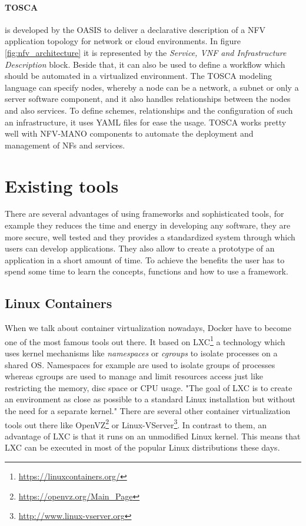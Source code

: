 \paragraph{\ac{TOSCA}} is developed by the \ac{OASIS} to deliver a declarative description of a \ac{NFV} application topology for network or cloud environments.\autocite[cf.]{Tosca:NFV}
In figure \ref{fig:nfv_architecture} it is represented by the \textit{Service, VNF and Infrastructure Description} block.
Beside that, it can also be used to define a workflow which should be automated in a virtualized environment.\autocite[cf.]{Tosca:NFV}
The \ac{TOSCA} modeling language can specify nodes, whereby a node can be a network, a subnet or only a server software component, and it also handles relationships between the nodes and also services.\autocite[cf.]{Tosca:NFV}
To define schemes, relationships and the configuration of such an infrastructure, it uses \ac{YAML} files for ease the usage.\autocite[cf.]{Tosca:NFV}
\ac{TOSCA} works pretty well with \ac{NFV-MANO} components to automate the deployment and management of \acp{NF} and services.


\section{Existing tools}

There are several advantages of using frameworks and sophisticated tools, for example they reduces the time and energy in developing any software, they are more secure, well tested and they provides a standardized system through which users can develop applications.
They also allow to create a prototype of an application in a short amount of time.
To achieve the benefits the user has to spend some time to learn the concepts, functions and how to use a framework.

\subsection{Linux Containers}
When we talk about container virtualization nowadays, Docker have to become one of the most famous tools out there.
It based on \ac{LXC}\footnote{\url{https://linuxcontainers.org/}} a technology which uses kernel mechanisms like \textit{namespaces} or \textit{cgroups} to isolate processes on a shared \ac{OS}.\autocite[cf.][p. 381]{Pahl:2015}
Namespaces for example are used to isolate groups of processes whereas cgroups are used to manage and limit resources access just like restricting the memory, disc space or \ac{CPU} usage.\autocite[cf.][p. 381]{Pahl:2015}
"The goal of \ac{LXC} is to create an environment as close as possible to a standard Linux installation but without the need for a separate kernel."\autocite[p. 72]{Tosatto:2015}
There are several other container virtualization tools out there like OpenVZ\footnote{\url{https://openvz.org/Main_Page}} or Linux-VServer\footnote{\url{http://www.linux-vserver.org}}.
In contrast to them, an advantage of \ac{LXC} is that it runs on an unmodified Linux kernel.
This means that \ac{LXC} can be executed in most of the popular Linux distributions these days.

